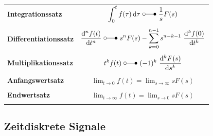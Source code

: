 \documentclass[a4paper]{article}
\begin{document}
\begin{table}[h!]
\begin{tabular}{@{}>{\bfseries}lc@{}}
Integrationssatz
	& $\displaystyle\int_0^t f(\tau)\,\mathrm{d}\tau\ \laplace\ \frac{1}{s} F(s)$ \\ \\
	
Differentiationssatz
	& $\displaystyle\frac{\mathrm{d}^n f(t)}{\mathrm{d}t^n}\ \laplace\ s^n F(s) - \sum_{k=0}^{n-1} s^{n-k-1}\ \frac{\mathrm{d}^k f(0)}{\mathrm{d}t^k}$ \\ \\
	
Multiplikationssatz
	& $\displaystyle t^k f(t)\ \laplace\ (-1)^k\ \frac{\mathrm{d}^k F(s)}{\mathrm{d}s^k}$ \\ \\
	
Anfangswertsatz
	& $\displaystyle \lim_{t \rightarrow 0} f(t) = \lim_{s \rightarrow \infty} s F(s)$ \\ \\
	
Endwertsatz
	& $\displaystyle \lim_{t \rightarrow \infty} f(t) = \lim_{s \rightarrow 0} s F(s)$ \\ \\

\bottomrule
\end{tabular}
\end{table}

\newpage
\subsection{Zeitdiskrete Signale}
\end{document}
